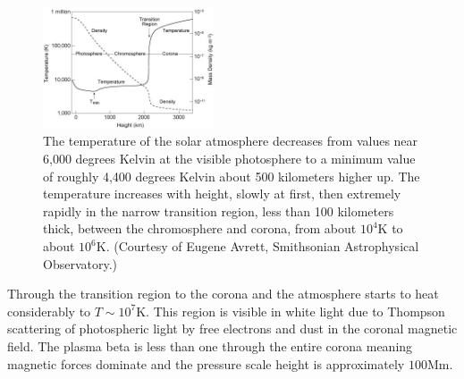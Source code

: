 \begin{figure}\label{solatm}
  \begin{center}
    \includegraphics[width=0.45\textwidth]{solar-atm-plot}
  \end{center}
\caption{The temperature of the solar atmosphere decreases from values near 6,000 degrees Kelvin at the visible photosphere to a minimum value of roughly 4,400 degrees Kelvin about 500 kilometers higher up. The temperature increases with height, slowly at first, then extremely rapidly in the narrow transition region, less than 100 kilometers thick, between the chromosphere and corona, from about $10^{4}$K to about $10^{6}$K. (Courtesy of Eugene Avrett, Smithsonian Astrophysical Observatory.) }
\end{figure}

Through the transition region to the corona and the atmosphere starts to heat considerably to $T\sim10^{7}$K. This region is visible in white light due to Thompson scattering of photospheric light by free electrons and dust in the coronal magnetic field. The plasma beta is less than one through the entire corona meaning magnetic forces dominate and the pressure scale height is approximately $100$Mm.  



